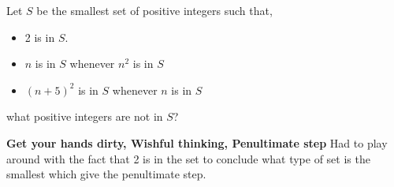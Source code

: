 \documentclass[11pt]{article}
\newenvironment{problem}[2][Problem\!]{\begin{trivlist}
\item[\hskip \labelsep {\bfseries #1}\hskip \labelsep {\bfseries #2}]}{\end{trivlist}}
\begin{document}
\begin{tcolorbox}
    \begin{problem} {OC | 11/22 | PP 20.}
        Let $S$ be the smallest set of positive integers such that,
        \begin{itemize}
            \item[(a)] 2 is in $S$.
            \item[(b)] $n$ is in $S$ whenever $n^2$ is in $S$
            \item[(c)] $(n+5)^{2}$ is in $S$ whenever $n$ is in $S$  
        \end{itemize}
        what positive integers are not in $S$?
    \end{problem}
    \textbf{Get your hands dirty, Wishful thinking, Penultimate step} Had to play around with the fact that 2 is in the set to conclude what type of set is the smallest which give the penultimate step. 
\end{tcolorbox}
\end{document}
